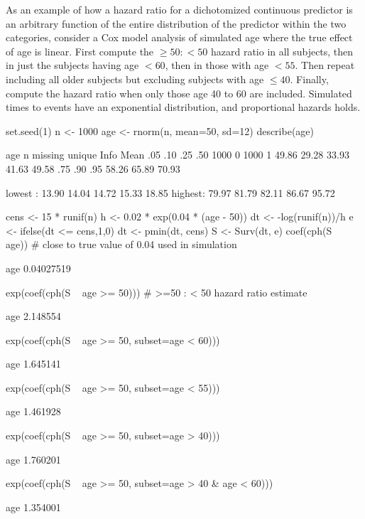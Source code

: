As an example of how a hazard ratio for a dichotomized continuous
predictor is an arbitrary function of the entire distribution of the
predictor within the two categories, consider a Cox model analysis of
simulated age where the true effect of age is linear.  First compute
the $\geq 50:< 50$ hazard ratio in all subjects, then in just the
subjects having age $< 60$, then in those with age $< 55$.  Then
repeat including all older subjects but excluding subjects with age
$\leq 40$.  Finally, compute the hazard ratio when only those age 40
to 60 are included.  Simulated times to events have an
exponential distribution, and proportional hazards holds.
\begin{Schunk}
\begin{Sinput}
set.seed(1)
n <- 1000
age <- rnorm(n, mean=50, sd=12)
describe(age)
\end{Sinput}
\begin{Soutput}
age 
      n missing  unique    Info    Mean     .05     .10     .25     .50 
   1000       0    1000       1   49.86   29.28   33.93   41.63   49.58 
    .75     .90     .95 
  58.26   65.89   70.93 

lowest : 13.90 14.04 14.72 15.33 18.85
highest: 79.97 81.79 82.11 86.67 95.72 
\end{Soutput}
\begin{Sinput}
cens <- 15 * runif(n)
h  <- 0.02 * exp(0.04 * (age - 50))
dt <- -log(runif(n))/h
e  <- ifelse(dt <= cens,1,0)
dt <- pmin(dt, cens)
S  <- Surv(dt, e)
coef(cph(S ~ age))   # close to true value of 0.04 used in simulation
\end{Sinput}
\begin{Soutput}
       age 
0.04027519 
\end{Soutput}
\begin{Sinput}
exp(coef(cph(S ~ age >= 50)))   # >=50 : < 50 hazard ratio estimate
\end{Sinput}
\begin{Soutput}
     age 
2.148554 
\end{Soutput}
\begin{Sinput}
exp(coef(cph(S ~ age >= 50, subset=age < 60)))
\end{Sinput}
\begin{Soutput}
     age 
1.645141 
\end{Soutput}
\begin{Sinput}
exp(coef(cph(S ~ age >= 50, subset=age < 55)))
\end{Sinput}
\begin{Soutput}
     age 
1.461928 
\end{Soutput}
\begin{Sinput}
exp(coef(cph(S ~ age >= 50, subset=age > 40)))
\end{Sinput}
\begin{Soutput}
     age 
1.760201 
\end{Soutput}
\begin{Sinput}
exp(coef(cph(S ~ age >= 50, subset=age > 40 & age < 60)))
\end{Sinput}
\begin{Soutput}
     age 
1.354001 
\end{Soutput}
\end{Schunk}

